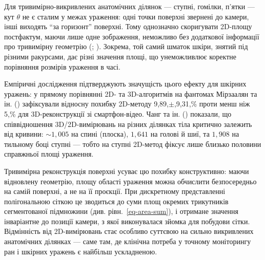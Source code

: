 \documentclass[
  ukrainian,
  10pt,
  a4paper,
  twocolumn]{article}
\begin{document}
Для тривимірно-викривлених анатомічних ділянок --- ступні, гомілки,
п'ятки --- кут \(\theta\) не є сталим у межах ураження: одні точки
поверхні звернені до камери, інші виходять ``за горизонт'' поверхні.
Тому однозначно скоригувати 2D-площу постфактум, маючи лише одне
зображення, неможливо без додаткової інформації про тривимірну геометрію
(;
). Зокрема, той самий шматок шкіри, знятий під різними ракурсами,
дає різні значення площі, що унеможливлює коректне порівняння розмірів
ураження в часі.

Емпіричні дослідження підтверджують значущість цього ефекту для шкірних
уражень: у прямому порівнянні 2D- та 3D-алгоритмів на фантомах Мірзаалян
та ін. () зафіксували відносну похибку 2D-методу 9,89,\(\pm\),9,31,\% проти
менш ніж 5,\% для 3D-реконструкції зі смартфон-відео. Чанг та ін.
() показали, що
співвідношення 3D/2D-вимірювань на різних ділянках тіла критично
залежить від кривини: \({\sim}1,005\) на спині (плоска), \(1,641\) на
голові й шиї, та \(1,908\) на тильному боці ступні --- тобто на ступні
2D-метод фіксує лише близько половини справжньої площі ураження.

Тривимірна реконструкція поверхні усуває цю похибку конструктивно: маючи
відновлену геометрію, площу області ураження можна обчислити
безпосередньо на самій поверхні, а не на її проєкції. При дискретному
представленні полігональною сіткою це зводиться до суми площ окремих
трикутників сегментованої підмножини (див. рівн.~\ref{eq-area-sum}), і
отримане значення інваріантне до позиції камери, з якої виконувалася
зйомка для побудови сітки. Відмінність від 2D-вимірювань стає особливо
суттєвою на сильно викривлених анатомічних ділянках --- саме там, де
клінічна потреба у точному моніторингу ран і шкірних уражень є найбільш
ускладненою.
\end{document}
